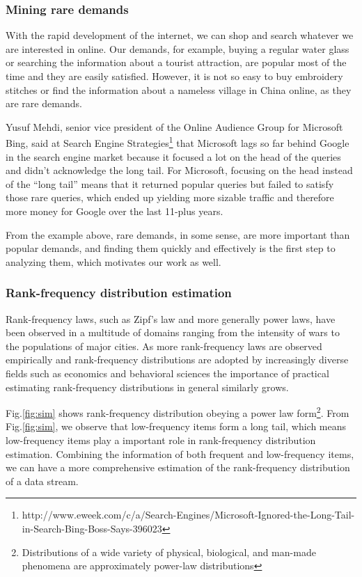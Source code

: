 \documentclass[conference]{IEEEtran}
\begin{document}
\subsubsection{Mining rare demands}
With the rapid development of the internet, we can shop and search whatever we are interested in online. Our demands, for example, buying a regular water glass or searching the information about a tourist attraction, are popular most of the time and they are easily satisfied. However, it is not so easy to buy embroidery stitches or find the information about a nameless village in China online, as they are rare demands.\par
Yusuf Mehdi, senior vice president of the Online Audience Group for Microsoft Bing, said at Search Engine Strategies\footnote{http://www.eweek.com/c/a/Search-Engines/Microsoft-Ignored-the-Long-Tail-in-Search-Bing-Boss-Says-396023} that Microsoft lags so far behind Google in the search engine market because it focused a lot on the head of the queries and didn't acknowledge the long tail. For Microsoft, focusing on the head instead of the ``long tail'' means that it returned popular queries but failed to satisfy those rare queries, which ended up yielding more sizable traffic and therefore more money for Google over the last 11-plus years.\par 
From the example above, rare demands, in some sense, are more important than popular demands, and finding them quickly and effectively is the first step to analyzing them, which motivates our work as well.

\subsubsection{Rank-frequency distribution estimation}\label{distribution estimation}
Rank-frequency laws, such as Zipf’s law and more generally power laws, have been observed in a multitude of domains ranging from the intensity of wars to the populations of major cities. As more rank-frequency laws are observed empirically and rank-frequency distributions are adopted by increasingly diverse fields such as economics and behavioral sciences the importance of practical estimating rank-frequency distributions in general similarly grows.\par
Fig.\ref{fig:sim} shows rank-frequency distribution obeying a power law form\footnote{Distributions of a wide variety of physical, biological, and man-made phenomena are approximately power-law distributions}. From Fig.\ref{fig:sim}, we observe that low-frequency items form a long tail, which means low-frequency items play a important role in rank-frequency distribution estimation. Combining the information of both frequent and low-frequency items, we can have a more comprehensive estimation of the rank-frequency distribution of a data stream.\par 
\end{document}
